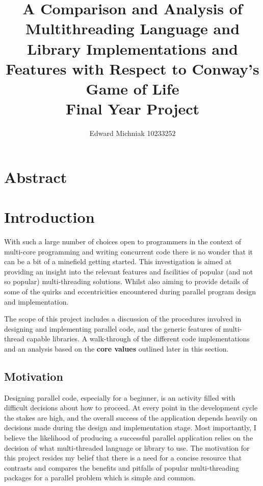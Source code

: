 \documentclass[11pt]{article} %
\title{A Comparison and Analysis of Multithreading Language and Library Implementations and Features with Respect to Conway's Game of Life\\Final Year Project}
\author{Edward Michniak 10233252}
\date{} %
\begin{document}
\maketitle
\pagebreak
\tableofcontents
\section{Abstract}
\section{Introduction}
With such a large number of choices open to programmers in the context of multi-core programming and writing concurrent code there is no wonder that it can be a bit of a minefield getting started. This investigation is aimed at providing an insight into the relevant features and facilities of popular (and not so popular) multi-threading solutions. Whilst also aiming to provide details of some of the quirks and eccentricities encountered during parallel program design and implementation.

The scope of this project includes a discussion of the procedures involved in designing and implementing parallel code, and the generic features of multi-thread capable libraries. A walk-through of the different code implementations and an analysis based on the {\bf core values} outlined later in this section.
\pagestyle{fancy} %
\subsection{Motivation}
Designing parallel code, especially for a beginner, is an activity filled with difficult decisions about how to proceed. At every point in the development cycle the stakes are high, and the overall success of the application depends heavily on decisions made during the design and implementation stage. Most importantly, I believe the likelihood of producing a successful parallel application relies on the decision of what multi-threaded language or library to use. The motivation for this project resides my belief that there is a need for a concise resource that contrasts and compares the benefits and pitfalls of popular multi-threading packages for a parallel problem which is simple and common.
\end{document}

